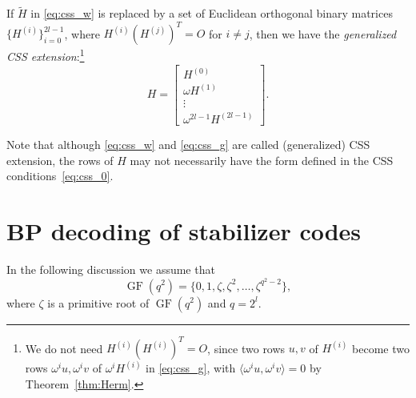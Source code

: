\documentclass{ieeeaccess}
\DeclareMathOperator{\GF}{GF}
\let\emph\textit
\theoremstyle{definition}		%
\begin{document}
If $\tilde H$ in \eqref{eq:css_w} is replaced by a set of Euclidean orthogonal binary matrices 
	$\{H^{(i)}\}_{i=0}^{2l-1}$, 
	where \mbox{$H^{(i)}(H^{(j)})^T = O$} for $i\ne j$, 
	then we have the \emph{generalized CSS extension}:\footnote{
		We do not need $H^{(i)} (H^{(i)})^T = O$, since two rows $u,v$ of $H^{(i)}$ become two rows $\omega^i u, \omega^i v$ of $\omega^i H^{(i)}$ 
		in \eqref{eq:css_g}, with $\langle \omega^i u, \omega^i v \rangle =0$ by Theorem~\ref{thm:Herm}.
		}
	\begin{equation} \label{eq:css_g}
	H = \left[ \begin{smallmatrix} H^{(0)} \\ \omega H^{(1)}  \\ \vdots\\ \omega^{2l-1} H^{(2l-1)}  \end{smallmatrix} \right].
	\end{equation}



Note that although \eqref{eq:css_w} and \eqref{eq:css_g} are called (generalized) CSS extension, the rows of $H$ may not necessarily have the form defined in the CSS conditions~\eqref{eq:css_0}.   %





\section{BP decoding of stabilizer codes} \label{sec:dec}

	In the following discussion we assume that  
		$$\GF(q^2)=\{0,1,\zeta, \zeta^2,\dots, \zeta^{q^2-2}\},$$  
	where $\zeta$ is a primitive root of $\GF(q^2)$ and $q=2^l$. %
\end{document}
